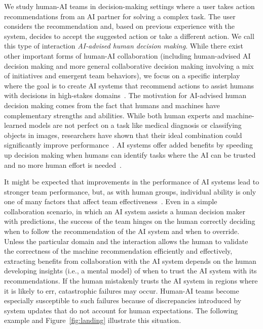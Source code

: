 \documentclass[letterpaper]{article} %
\newcommand{\bug}
    {\mbox{\rule{2mm}{2mm}}}
\newcommand{\Bug}[1]
    {\bug \footnote{BUG: {#1}}}
\newcommand{\?}{\mbox{?}}
\begin{document}
We study human-AI teams in decision-making settings where a user takes action recommendations from an AI partner for solving a complex task. The user considers the recommendation and, based on previous experience with the system, decides to accept the suggested action or take a different action. We call this type of interaction {\em AI-advised human decision making}. While there exist other important forms of human-AI collaboration (including human-advised AI decision making and more general collaborative decision making involving a mix of initiatives and emergent team behaviors), we focus on a specific interplay where the goal is to create AI systems that recommend actions to assist humans with decisions in high-stakes domains~\cite{angwin2016machine,bayati2014data}. The motivation for AI-advised human decision making comes from the fact that humans and machines have complementary strengths and abilities. While both human experts and machine-learned models are not perfect on a task like medical diagnosis or classifying objects in images, researchers have shown that their ideal combination could significantly improve performance~\cite{wang2016deep,kamar2012combining}. 
AI systems offer added benefits by speeding up decision making when humans can identify tasks where the AI can be trusted and no more human effort is needed~\cite{lasecki2012scribe,lasecki2012real}. 

It might be expected that improvements in the performance of AI systems lead to stronger team performance, but, as with human groups, individual ability is only one of many factors that affect team effectiveness~\cite{dechurch-jap10,grosz1996collaborative}. Even in a simple collaboration scenario, in which an AI system assists a human decision maker with predictions, the success of the team hinges on the human correctly deciding when to follow the recommendation of the AI system and when to override. Unless the particular domain and the interaction allows the human to validate the correctness of the machine recommendation efficiently and effectively, extracting benefits from collaboration with the AI system depends on the human developing insights (i.e., a mental model) of when to trust the AI system with its recommendations. If the human mistakenly trusts the AI system in regions where it is likely to err, catastrophic failures may occur. 
Human-AI teams become especially susceptible to such failures because of discrepancies introduced by system updates that do not account for human expectations. The following example and Figure~\ref{fig:landing} illustrate this situation.
\end{document}
